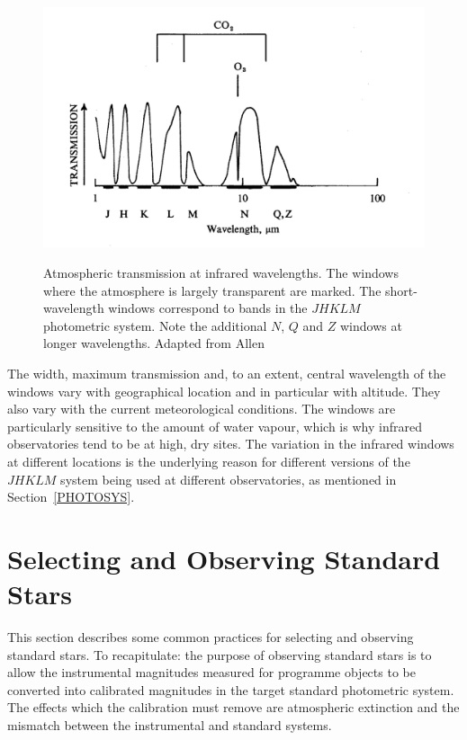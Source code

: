 \documentclass[twoside,11pt]{article}
\newcommand{\xlabel}[1]{}
\begin{document}
\begin{figure}[htbp]
   \centering
   \includegraphics[totalheight=3.5in]{sc6_irwindows}
   \begin{quote}
   \caption[Atmospheric transmission at infrared wavelengths]
    {Atmospheric transmission at infrared wavelengths.  The windows where
    the atmosphere is largely transparent are marked.  The short-wavelength
    windows correspond to bands in the $JHKLM$ photometric system.  Note
    the additional $N$, $Q$ and $Z$ windows at longer wavelengths.  Adapted
    from Allen\cite{ALLEN75}
   \label{IRWINDOWS} }
   \end{quote}
\end{figure}

The width, maximum transmission and, to an extent, central wavelength
of the windows vary with geographical location and in particular with
altitude.  They also vary with the current meteorological conditions.
The windows are particularly sensitive to the amount of water
vapour, which is why infrared observatories tend to be at high, dry sites.
The variation in the infrared windows at different locations is the
underlying reason for different versions of the $JHKLM$ system being
used at different observatories, as mentioned in Section~\ref{PHOTOSYS}.


\section{\xlabel{SELOBS_STANDARD}\label{SELOBS_STANDARD}Selecting and
Observing Standard Stars}

This section describes some common practices for selecting and observing
standard stars.  To recapitulate: the purpose of observing standard stars
is to allow the instrumental magnitudes measured for programme objects to
be converted into calibrated magnitudes in the target standard photometric
system.  The effects which the calibration must remove are atmospheric
extinction and the mismatch between the instrumental and standard systems.
\end{document}
